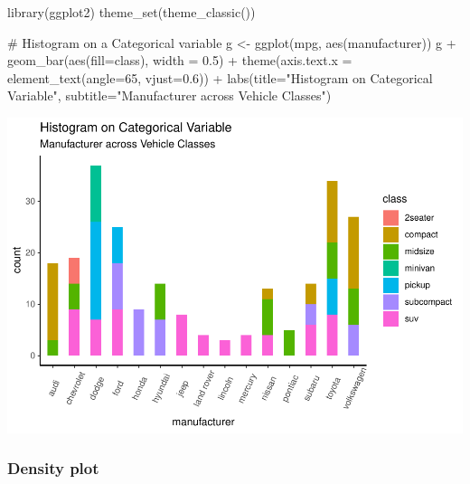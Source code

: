 \documentclass[a4paper]{article}
\newenvironment{Shaded}{}{}
\newcommand{\KeywordTok}[1]{\textcolor[rgb]{0.00,0.00,1.00}{#1}}
\newcommand{\DataTypeTok}[1]{#1}
\newcommand{\DecValTok}[1]{#1}
\newcommand{\FloatTok}[1]{#1}
\newcommand{\StringTok}[1]{\textcolor[rgb]{0.00,0.50,0.50}{#1}}
\newcommand{\CommentTok}[1]{\textcolor[rgb]{0.00,0.50,0.00}{#1}}
\newcommand{\OperatorTok}[1]{#1}
\newcommand{\NormalTok}[1]{#1}
\begin{document}
\begin{Shaded}
\begin{Highlighting}[]
\KeywordTok{library}\NormalTok{(ggplot2)}
\KeywordTok{theme_set}\NormalTok{(}\KeywordTok{theme_classic}\NormalTok{())}

\CommentTok{# Histogram on a Categorical variable}
\NormalTok{g <-}\StringTok{ }\KeywordTok{ggplot}\NormalTok{(mpg, }\KeywordTok{aes}\NormalTok{(manufacturer))}
\NormalTok{g }\OperatorTok{+}\StringTok{ }\KeywordTok{geom_bar}\NormalTok{(}\KeywordTok{aes}\NormalTok{(}\DataTypeTok{fill=}\NormalTok{class), }\DataTypeTok{width =} \FloatTok{0.5}\NormalTok{) }\OperatorTok{+}\StringTok{ }
\StringTok{  }\KeywordTok{theme}\NormalTok{(}\DataTypeTok{axis.text.x =} \KeywordTok{element_text}\NormalTok{(}\DataTypeTok{angle=}\DecValTok{65}\NormalTok{, }\DataTypeTok{vjust=}\FloatTok{0.6}\NormalTok{)) }\OperatorTok{+}\StringTok{ }
\StringTok{  }\KeywordTok{labs}\NormalTok{(}\DataTypeTok{title=}\StringTok{"Histogram on Categorical Variable"}\NormalTok{, }
       \DataTypeTok{subtitle=}\StringTok{"Manufacturer across Vehicle Classes"}\NormalTok{) }
\end{Highlighting}
\end{Shaded}

\includegraphics{M24-ggplot2_Gallery_files/figure-latex/unnamed-chunk-24-1.pdf}

\newpage

\subsubsection{Density plot}\label{density-plot}
\end{document}
